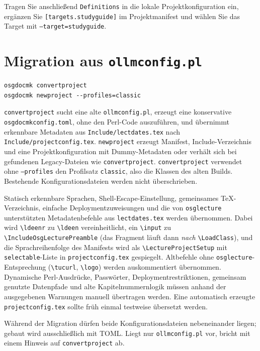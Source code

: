 \documentclass[
load-preamble+
]{osgdoc}
\begin{document}
Tragen Sie anschließend \texttt{Definitions} in die lokale Projektkonfiguration
ein, ergänzen Sie \verb|[targets.studyguide]| im Projektmanifest und wählen Sie
das Target mit \texttt{--target=studyguide}.

\section{Migration aus \texttt{ollmconfig.pl}}

\begin{verbatim}
osgdocmk convertproject
osgdocmk newproject --profiles=classic
\end{verbatim}

\texttt{convertproject} sucht eine alte \texttt{ollmconfig.pl}, erzeugt
eine konservative \texttt{osgdocmkconfig.toml}, ohne den Perl-Code auszuführen,
und übernimmt erkennbare Metadaten aus \texttt{Include/lectdates.tex} nach
\texttt{Include/projectconfig.tex}. \texttt{newproject} erzeugt Manifest,
Include-Verzeichnis und eine Projektkonfiguration mit Dummy-Metadaten oder
verhält sich bei gefundenen Legacy-Dateien wie \texttt{convertproject}.
\texttt{convertproject} verwendet ohne \texttt{--profiles} den Profilsatz
\texttt{classic}, also die Klassen des alten Builds.
Bestehende Konfigurationsdateien werden nicht überschrieben.

Statisch erkennbare Sprachen, Shell-Escape-Einstellung, gemeinsames
TeX-Verzeichnis, einfache Deploymentzuweisungen und die von \texttt{osglecture}
unterstützten Metadatenbefehle aus \texttt{lectdates.tex} werden übernommen.
Dabei wird \texttt{\textbackslash ldeenr} zu \texttt{\textbackslash ldeen}
vereinheitlicht, ein \texttt{\textbackslash input} zu
\texttt{\textbackslash IncludeOsgLecturePreamble} (das Fragment läuft dann
\emph{nach} \texttt{\textbackslash LoadClass}), und die Sprachreihenfolge des
Manifests wird als \texttt{\textbackslash LectureProjectSetup} mit
\texttt{selectable}-Liste in \texttt{projectconfig.tex} gespiegelt.
Altbefehle ohne \texttt{osglecture}-Entsprechung
(\texttt{\textbackslash tucurl}, \texttt{\textbackslash logo}) werden
auskommentiert übernommen. Dynamische Perl-Ausdrücke, Passwörter,
Deploymentrestriktionen, gemeinsam genutzte Datenpfade und alte
Kapitelnummernlogik müssen anhand der ausgegebenen Warnungen manuell übertragen
werden. Eine automatisch erzeugte \texttt{projectconfig.tex} sollte früh
einmal testweise übersetzt werden.

Während der Migration dürfen beide Konfigurationsdateien nebeneinander liegen;
gebaut wird ausschließlich mit TOML. Liegt nur \texttt{ollmconfig.pl} vor,
bricht \osgdocmk{} mit einem Hinweis auf \texttt{convertproject} ab.
\end{document}
